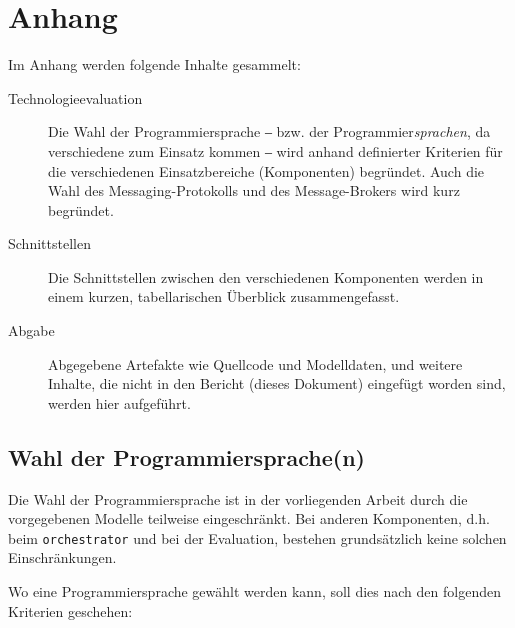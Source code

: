 \section{Anhang}

Im Anhang werden folgende Inhalte gesammelt:

\begin{description}
    \item[Technologieevaluation] Die Wahl der Programmiersprache ‒ bzw. der Programmier\textit{spra\-chen}, da verschiedene zum Einsatz kommen ‒ wird anhand definierter Kriterien für die verschiedenen Einsatzbereiche (Komponenten) begründet. Auch die Wahl des Messaging-Protokolls und des Message-Brokers wird kurz begründet.
    \item[Schnittstellen] Die Schnittstellen zwischen den verschiedenen Komponenten werden in einem kurzen, tabellarischen Überblick zusammengefasst.
    \item[Abgabe] Abgegebene Artefakte wie Quellcode und Modelldaten, und weitere Inhalte, die nicht in den Bericht (dieses Dokument) eingefügt worden sind, werden hier aufgeführt.
\end{description}

\subsection{Wahl der Programmiersprache(n)}
\label{sec:wahl-der-programmiersprache}

Die Wahl der Programmiersprache ist in der vorliegenden Arbeit durch die vorgegebenen Modelle teilweise eingeschränkt. Bei anderen Komponenten, d.h. beim \texttt{orchestrator} und bei der Evaluation, bestehen grundsätzlich keine solchen Einschränkungen.

Wo eine Programmiersprache gewählt werden kann, soll dies nach den folgenden Kriterien geschehen:

